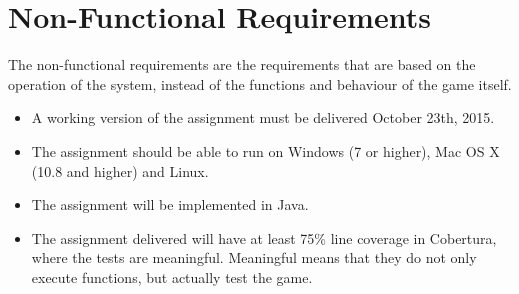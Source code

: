 \chapter{Non-Functional Requirements}

The non-functional requirements are the requirements that are based on the operation of the system, instead of the functions and behaviour of the game itself.

\begin{itemize}
\itemsep0em
	\item A working version of the assignment must be delivered October 23th, 2015.
	\item The assignment should be able to run on Windows (7 or higher), Mac OS X (10.8 and higher) and Linux.
	\item The assignment will be implemented in Java. 
	\item The assignment delivered will have at least 75\% line coverage in Cobertura, where the tests are meaningful. Meaningful means that they do not only execute functions, but actually test the game. 
\end{itemize}